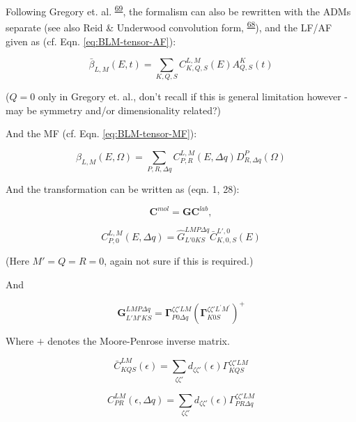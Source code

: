 \documentclass[10pt]{article}
\begin{document}
Following Gregory et. al. \textsuperscript{\hyperref[csl:69]{69}}, the formalism can also be rewritten with
the ADMs separate (see also Reid \& Underwood convolution form, \textsuperscript{\hyperref[csl:68]{68}}), and the LF/AF given as (cf. Eqn. \ref{eq:BLM-tensor-AF}):

\begin{equation}
\bar{\beta}_{L,M}(E,t)=\sum_{K,Q,S}C_{K,Q,S}^{L,M}(E)A_{Q,S}^{K}(t)
\end{equation}

($Q=0$ only in Gregory et. al., don't recall if this is general limitation
however - may be symmetry and/or dimensionality related?)

And the MF (cf. Eqn. \ref{eq:BLM-tensor-MF}):

\begin{equation}
\beta_{L,M}(E,\Omega)=\sum_{P,R,\Delta q}C_{P,R}^{L,M}(E,\Delta q)D_{R,\Delta q}^{P}(\Omega)
\end{equation}

And the transformation can be written as (eqn. 1, 28):

\begin{equation}
\mathbf{C}^{mol}=\mathbf{G}\mathbf{C}^{lab},\label{eq:basic}
\end{equation}

\begin{equation}
C_{P,0}^{L,M}(E,\Delta q)=\hat{G}_{L'0KS}^{LMP\Delta q}\bar{C}_{K,0,S}^{L',0}(E)
\end{equation}

(Here $M'=Q=R=0$, again not sure if this is required.)

And

\begin{equation}
\mathbf{G}_{L'M'KS}^{LMP\Delta q}=\mathbf{\Gamma}_{P0\Delta q}^{\zeta\zeta'LM}(\mathbf{\Gamma}_{K0S}^{\zeta\zeta'L^{\prime}M^{\prime}})^{+}
\end{equation}

Where $+$ denotes the Moore-Penrose inverse matrix.

\begin{equation}
\bar{C}_{KQS}^{LM}(\epsilon)=\sum_{\zeta\zeta'}d_{\zeta\zeta'}(\epsilon)\Gamma_{KQS}^{\zeta\zeta'LM}
\end{equation}

\begin{equation}
C_{PR}^{LM}(\epsilon,\Delta q)=\sum_{\zeta\zeta'}d_{\zeta\zeta'}(\epsilon)\Gamma_{PR\Delta q}^{\zeta\zeta'LM}
\end{equation}
\end{document}
